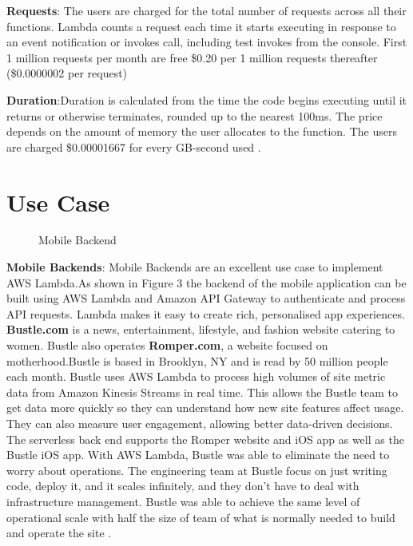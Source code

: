 \documentclass[9pt,twocolumn,twoside]{../../styles/osajnl}
\begin{document}
\textbf{Requests}: The users are charged for the total number of requests 
across all their functions. Lambda counts a request each time it starts 
executing in response to an event notification or invokes call, including test 
invokes from the console. First 1 million requests per month are free
\$0.20 per 1 million requests thereafter (\$0.0000002 per request)

\textbf{Duration}:Duration is calculated from the time the code begins 
executing until it returns or otherwise terminates, rounded up to the nearest 
100ms. The price depends on the amount of memory the user allocates to the 
function. The users are charged \$0.00001667 for every GB-second used 
\cite{www-AWSLambdaPricing}.

\section{Use Case}



\renewcommand{\labelitemi}{\scriptsize$\bullet$} 
\begin{figure}[H]
\centering
\graphicspath{ {images/} }
\caption{Mobile Backend} \cite{www-AWSLambda}
\label{fig:false-color}
\end{figure}

\textbf{Mobile Backends}: Mobile Backends are an excellent use case to 
implement AWS Lambda.As shown in Figure 3 the backend of the mobile application 
can be built using AWS Lambda and Amazon API Gateway to authenticate and 
process API requests. Lambda makes it easy to create rich, personalised app 
experiences.
\textbf{Bustle.com} is a news, entertainment, lifestyle, and fashion website 
catering to women. Bustle also operates \textbf{Romper.com}, a website focused 
on motherhood.Bustle is based in Brooklyn, NY and is read by 50 million people 
each month. Bustle uses AWS Lambda to process high volumes of site metric data 
from Amazon Kinesis Streams \cite{www-AWSKinesis} in real time. This allows the 
Bustle team to get data more quickly so they can understand how new site 
features affect usage. They can also measure user engagement, allowing better 
data-driven decisions. The serverless back end supports the Romper website and 
iOS app as well as the Bustle iOS app. With AWS Lambda, Bustle was able to 
eliminate the need to worry about operations. The engineering team at Bustle 
focus on just writing code, deploy it, and it scales infinitely, and they don't 
have to deal with infrastructure management. Bustle was able to achieve the 
same level of operational scale with half the size of team of what is normally 
needed to build and operate the site  \cite{www-AWSLambdaBustle}.
\end{document}
